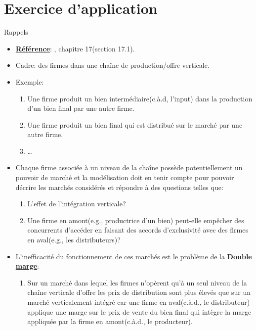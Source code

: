 \section{Exercice d'application}
\frame{\sectionpage}
\begin{frame}[allowframebreaks]{Rappels}
\begin{itemize}
\item \textbf{\underline{Référence}}: \cite{belleflamme_peitz_2015}, chapitre 17(section 17.1).
\item Cadre: des firmes dans une chaîne de production/offre verticale. 
\item Exemple:
\begin{enumerate}[$\star$]
    \item Une firme produit un bien intermédiaire(c.à.d, l'input) dans la production d'un bien final 
    par une autre firme. 
    \item Une firme produit un bien final qui est distribué sur le marché par une autre firme. 
    \item \ldots
\end{enumerate} 
\item Chaque firme associée à un niveau de la chaîne possède potentiellement un pouvoir de marché 
et la modélisation doit en tenir compte pour pouvoir décrire les marchés considérés et répondre à des questions telles que: 
\begin{enumerate}[$\star$]
\item L'effet de l'intégration verticale?
\item Une firme en amont(e.g., productrice d'un bien) peut-elle empêcher des concurrents 
d'accéder en faisant des accords d'exclusivité avec des firmes en aval(e.g., les distributeurs)?
\end{enumerate} 

\framebreak

\item L'inefficacité du fonctionnement de ces marchés est le problème de la  \textbf{\underline{Double marge}}:
\begin{enumerate}[$\star$]
\item Sur un marché dans lequel les firmes n'opèrent qu'à un seul niveau de la chaîne verticale d'offre 
les prix de distribution sont plus élevés que sur un marché verticalement intégré car une firme 
en aval(c.à.d., le distributeur) applique une marge sur le prix de vente du bien final qui intègre la marge appliquée 
par la firme en amont(c.à.d., le producteur).
\end{enumerate}


\end{itemize}
\end{frame}
